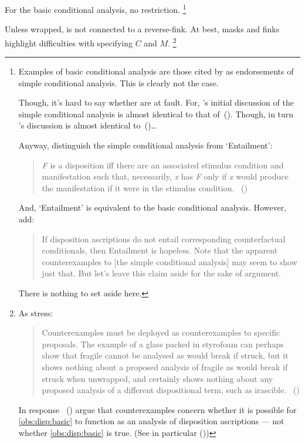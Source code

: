\begin{note}
  For the basic conditional analysis, no restriction.%
  \footnote{
    Examples of basic conditional analysis are those cited by \citeauthor{Choi:2021wg} as endorsements of simple conditional analysis.
    This is clearly not the case.

    Though, it's hard to say whether \citeauthor{Choi:2021wg} are at fault.
    For, \citeauthor{Choi:2021wg}'s initial discussion of the simple conditional analysis is almost identical to that of~(\cite[60]{Manley:2008aa}).
    Though, in turn \citeauthor{Manley:2008aa}'s discussion is almost identical to~(\cite[\S2.1]{Fara:2006aa})\dots

    Anyway, \citeauthor{Choi:2021wg} distinguish the simple conditional analysis from `Entailment':
    \begin{quote}
      \emph{F} is a disposition iff there are an associated stimulus condition and manifestation such that, necessarily, \emph{x} has \emph{F} only if \emph{x} would produce the manifestation if it were in the stimulus condition.%
      \mbox{ }\hfill\mbox{(\citeyear[\S2.1]{Choi:2021wg})}
    \end{quote}
    And, `Entailment' is equivalent to the basic conditional analysis.
    However, \citeauthor{Choi:2021wg} add:
    \begin{quote}
      If disposition ascriptions do not entail corresponding counterfactual conditionals, then Entailment is hopeless.
      Note that the apparent counterexamples to [the simple conditional analysis] may seem to show just that.
      But let's leave this claim aside for the sake of argument.
    \end{quote}
    There is nothing to set aside here.
  }

  Unless wrapped, is not connected to a reverse-fink.
  At best, masks and finks highlight difficulties with specifying \(C\) and \(M\).%
  \footnote{
    As \citeauthor{Bonevac:2011tz} stress:
    \begin{quote}
      Counterexamples must be deployed as counterexamples to specific proposals.
      The example of a glass packed in styrofoam can perhaps show that fragile cannot be analysed as would break if struck, but it shows nothing about a proposed analysis of fragile as would break if struck when unwrapped, and certainly shows nothing about any proposed analysis of a different dispositional term, such as irascible.%
      \mbox{ }\hfill\mbox{(\citeyear[1144]{Bonevac:2011tz})}
    \end{quote}

    \nocite{Manley:2007aa}
    In response~\cite{Manley:2011aa} (\citeyear{Manley:2011aa}) argue that counterexamples concern whether it is possible for \autoref{obs:disp:basic} to function as an analysis of disposition ascriptions --- not whether \autoref{obs:disp:basic} is true.
    (See in particular (\citeyear[\S1.3]{Manley:2011aa}))
  }


\end{note}
